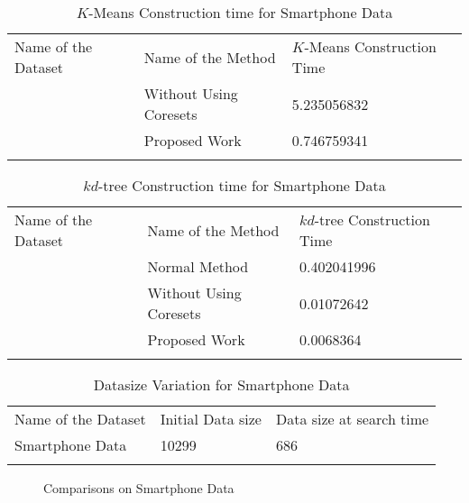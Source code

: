 \documentclass[runningheads]{llncs}
\begin{document}
\begin{table}[!hbt]
	\caption{$K$-Means Construction time for Smartphone Data}
	\label{tab:15}       %
	\begin{tabular}{p{3cm}p{4cm}p{3.4cm}}
		\hline\noalign{\smallskip}
		Name of the Dataset & Name of the Method & $K$-Means Construction Time  \\
		\noalign{\smallskip}\hline\noalign{\smallskip}
		\multirow{2}{*}{Smartphone Data} & Without Using Coresets & 5.235056832\\
		& Proposed Work  & 0.746759341\\
		\noalign{\smallskip}\hline\noalign{\smallskip}
	\end{tabular}
\end{table}
\begin{table}[!hbt]
	\caption{$kd$-tree Construction time for Smartphone Data}
	\label{tab:14}       %
	\begin{tabular}{p{3cm}p{4cm}p{3.4cm}}
		\hline\noalign{\smallskip}
		Name of the Dataset & Name of the Method & $kd$-tree Construction Time  \\
		\noalign{\smallskip}\hline\noalign{\smallskip}
		\multirow{3}{*}{Smartphone Data} & Normal Method  & 0.402041996\\
		& Without Using Coresets & 0.01072642\\
		& Proposed Work  & 0.0068364\\
		\noalign{\smallskip}\hline\noalign{\smallskip}
	\end{tabular}
\end{table}	
\begin{table}[!hbt]
	\caption{Datasize Variation for Smartphone Data}
	\label{tab:16}       %
	\begin{tabular}{p{3cm}p{4cm}p{3.4cm}}
		\hline\noalign{\smallskip}
		Name of the Dataset & Initial Data size & Data size at search time  \\
		\noalign{\smallskip}\hline\noalign{\smallskip}
		Smartphone Data& 10299  & 686 \\
		\noalign{\smallskip}\hline\noalign{\smallskip}
	\end{tabular}
\end{table}
\begin{figure}[!hbt]
	\hspace{0mm}
	\hspace{0mm}
	\caption{Comparisons on Smartphone Data }
	\label{fig:6}     
\end{figure}
\end{document}
